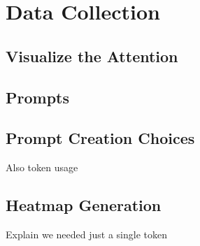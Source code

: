 \chapter{Data Collection}
\label{cha:data_collection}

\section{Visualize the Attention}
\label{sec:visualize_the_attention}

\section{Prompts}
\label{sec:prompts}

\section{Prompt Creation Choices}
\label{sec:prompt_creation_choices}

Also token usage

\section{Heatmap Generation}
\label{sec:heatmap_generation}

Explain we needed just a single token